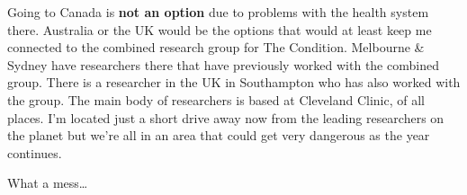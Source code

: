 Going to Canada is \textbf{not an option} due to problems with the
health system there. Australia or the UK would be the options that would
at least keep me connected to the combined research group for The
Condition. Melbourne \& Sydney have researchers there that have
previously worked with the combined group. There is a researcher in the
UK in Southampton who has also worked with the group. The main body of
researchers is based at Cleveland Clinic, of all places. I'm located
just a short drive away now from the leading researchers on the planet
but we're all in an area that could get very dangerous as the year
continues.

What a mess\ldots{}

